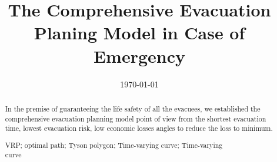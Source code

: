 \documentclass{mcmthesis}	%
\title{\large The Comprehensive Evacuation Planing Model in Case of Emergency}
\author{ }%
\date{\today}%
\begin{document}


\begin{abstract}%

In the premise of guaranteeing the life safety of all the evacuees, we established the comprehensive evacuation planning model point of view from the shortest evacuation time, lowest evacuation risk, low economic losses angles to reduce the loss to minimum.

%
%


\begin{keywords}%
VRP; optimal path; Tyson polygon; Time-varying curve; Time-varying \\  curve
\end{keywords}%
\end{abstract}%
\maketitle%
\newpage                                                         %
\begin{adjustwidth}{-1cm}{0cm}

\setcounter{tocdepth}{3}
\thispagestyle{empty}
\tableofcontents                                                  %

\end{adjustwidth}
\end{document}
